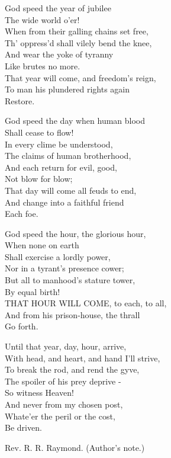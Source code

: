\begin{rverse}
God speed the year of jubilee \\
The wide world o’er! \\
When from their galling chains set free, \\
Th’ oppress’d shall vilely bend the knee, \\
And wear the yoke of tyranny \\
Like brutes no more. \\
That year will come, and freedom’s reign, \\
To man his plundered rights again \\
Restore.
\end{rverse}

\begin{rverse}
God speed the day when human blood \\
Shall cease to flow! \\
In every clime be understood, \\
The claims of human brotherhood, \\
And each return for evil, good, \\
Not blow for blow; \\
That day will come all feuds to end, \\
And change into a faithful friend \\
Each foe.
\end{rverse}

\begin{rverse}
God speed the hour, the glorious hour, \\
When none on earth \\
Shall exercise a lordly power, \\
Nor in a tyrant’s presence cower; \\
But all to manhood’s stature tower, \\
By equal birth! \\
THAT HOUR WILL COME, to each, to all, \\
And from his prison-house, the thrall \\
Go forth.
\end{rverse}

\begin{rverse}
Until that year, day, hour, arrive, \\
With head, and heart, and hand I’ll strive, \\
To break the rod, and rend the gyve, \\
The spoiler of his prey deprive - \\
So witness Heaven! \\
And never from my chosen post, \\
Whate’er the peril or the cost, \\
Be driven.
\end{rverse}

\begin{readnote}
[*] Rev. R. R. Raymond. (Author’s note.)
\end{readnote}

\endgroup
